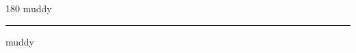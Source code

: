 
\begin{frame}
\begin{center}
\begin{turn}{180}
{\fontsize{2.5cm}{1em}\selectfont muddy}
\end{turn}
\vspace{1em}\par  
\hrule
\vspace{1em}\par  
{\fontsize{2.5cm}{1em}\selectfont muddy}
\end{center}
\end{frame}
